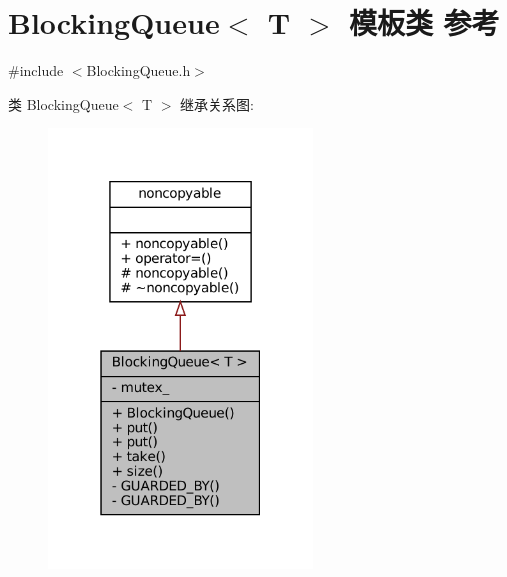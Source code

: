 \hypertarget{classmuduo_1_1BlockingQueue}{}\section{Blocking\+Queue$<$ T $>$ 模板类 参考}
\label{classmuduo_1_1BlockingQueue}


{\ttfamily \#include $<$Blocking\+Queue.\+h$>$}



类 Blocking\+Queue$<$ T $>$ 继承关系图\+:
\nopagebreak
\begin{figure}[H]
\begin{center}
\leavevmode
\includegraphics[width=199pt]{classmuduo_1_1BlockingQueue__inherit__graph}
\end{center}
\end{figure}


